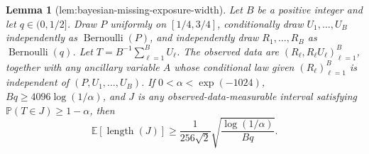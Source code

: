 \documentclass{article}
\newtheorem{lemma}{Lemma}
\begin{document}
\begin{lemma}[lem:bayesian-missing-exposure-width]\label{lem:bayesian-missing-exposure-width}
Let \(B\) be a positive integer and let \(q\in(0,1/2]\). Draw \(P\) uniformly on \([1/4,3/4]\), conditionally draw \(U_1,\ldots,U_B\) independently as \(\operatorname{Bernoulli}(P)\), and independently draw \(R_1,\ldots,R_B\) as \(\operatorname{Bernoulli}(q)\). Let \(T=B^{-1}\sum_{\ell=1}^B U_\ell\). The observed data are \((R_\ell,R_\ell U_\ell)_{\ell=1}^B\), together with any ancillary variable \(A\) whose conditional law given \((R_\ell)_{\ell=1}^B\) is independent of \((P,U_1,\ldots,U_B)\). If \(0<\alpha<\exp(-1024)\), \(Bq\ge4096\log(1/\alpha)\), and \(J\) is any observed-data-measurable interval satisfying \(\mathbb P(T\in J)\ge1-\alpha\), then
\[
\mathbb E[\operatorname{length}(J)]\ge\frac{1}{256\sqrt{2}}\sqrt{\frac{\log(1/\alpha)}{Bq}}.
\]
\end{lemma}
\end{document}
